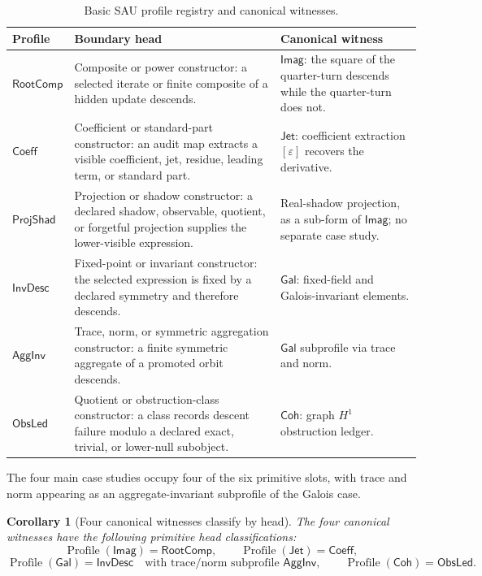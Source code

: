 \documentclass[11pt]{article}
\newcommand{\Prof}{\operatorname{Profile}}
\newcommand{\Imag}{\mathsf{Imag}}
\newcommand{\Jet}{\mathsf{Jet}}
\newcommand{\Galois}{\mathsf{Gal}}
\newcommand{\Coh}{\mathsf{Coh}}
\newcommand{\RootComp}{\mathsf{RootComp}}
\newcommand{\Coeff}{\mathsf{Coeff}}
\newcommand{\InvDesc}{\mathsf{InvDesc}}
\newcommand{\AggInv}{\mathsf{AggInv}}
\newcommand{\ObsLed}{\mathsf{ObsLed}}
\newcommand{\ProjShad}{\mathsf{ProjShad}}
\newtheorem{corollary}[theorem]{Corollary}
\theoremstyle{definition}
\begin{document}
\begingroup\begin{table}[tbp]
\centering
\footnotesize
\caption{Basic SAU profile registry and canonical witnesses.}
\label{tab:profile-registry}
\begin{tabularx}{\textwidth}{@{}>{\raggedright\arraybackslash}p{}X>{\raggedright\arraybackslash}p{}@{}}
\toprule
Profile & Boundary head & Canonical witness \\
\midrule
\(\RootComp\) & Composite or power constructor: a selected iterate or finite composite of a hidden update descends. & \(\Imag\): the square of the quarter-turn descends while the quarter-turn does not. \\
\(\Coeff\) & Coefficient or standard-part constructor: an audit map extracts a visible coefficient, jet, residue, leading term, or standard part. & \(\Jet\): coefficient extraction \([\varepsilon]\) recovers the derivative. \\
\(\ProjShad\) & Projection or shadow constructor: a declared shadow, observable, quotient, or forgetful projection supplies the lower-visible expression. & Real-shadow projection, as a sub-form of \(\Imag\); no separate case study. \\
\(\InvDesc\) & Fixed-point or invariant constructor: the selected expression is fixed by a declared symmetry and therefore descends. & \(\Galois\): fixed-field and Galois-invariant elements. \\
\(\AggInv\) & Trace, norm, or symmetric aggregation constructor: a finite symmetric aggregate of a promoted orbit descends. & \(\Galois\) subprofile via trace and norm. \\
\(\ObsLed\) & Quotient or obstruction-class constructor: a class records descent failure modulo a declared exact, trivial, or lower-null subobject. & \(\Coh\): graph \(H^1\) obstruction ledger. \\
\bottomrule
\end{tabularx}
\end{table}
 \endgroup

The four main case studies occupy four of the six primitive slots, with trace and
norm appearing as an aggregate-invariant subprofile of the Galois case.

\begin{corollary}[Four canonical witnesses classify by head]
\label{cor:sau-four-cases-classify-by-head}
The four canonical witnesses have the following primitive head classifications:
\[
\Prof(\Imag)=\RootComp,
\qquad
\Prof(\Jet)=\Coeff,
\]
\[
\Prof(\Galois)=\InvDesc
\quad\text{with trace/norm subprofile }\AggInv,
\qquad
\Prof(\Coh)=\ObsLed.
\]
\end{corollary}
\end{document}
